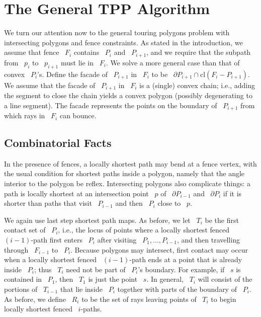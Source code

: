 \documentclass[11pt]{article}
\begin{document}
\section{The General TPP Algorithm}

We turn our attention now to the general touring polygons problem with intersecting polygons and fence constraints.
As stated in the introduction, we assume that fence ~\(F_i\) contains ~\(P_i\) and ~\(P_{i+1}\), and we require that the subpath from ~\(p_i\) to ~\(p_{i+1}\) must lie in ~\(F_i\).
We solve a more general case than that of convex ~\(P_i\)'s.
Define the facade of ~\(P_{i+1}\) in ~\(F_i\) to be ~\(\partial P_{i+1} \cap \mathrm{cl}(F_i - P_{i+1})\).
We assume that the facade of ~\(P_{i+1}\) in ~\(F_i\) is a (single) convex chain; i.e., adding the segment to close the chain yields a convex polygon (possibly degenerating to a line segment).
The facade represents the points on the boundary of ~\(P_{i+1}\) from which rays in ~\(F_i\) can bounce.

\subsection{Combinatorial Facts}

In the presence of fences, a locally shortest path may bend at a fence vertex, with the usual condition for shortest paths inside a polygon, namely that the angle interior to the polygon be reflex.
Intersecting polygons also complicate things: a path is locally shortest at an intersection point ~\(p\) of ~\(\partial P_{i-1}\) and ~\(\partial P_i\) if it is shorter than paths that visit ~\(P_{i-1}\) and then ~\(P_i\) close to ~\(p\).

We again use last step shortest path maps.
As before, we let ~\(T_i\) be the first contact set of ~\(P_i\), i.e., the locus of points where a locally shortest fenced ~\((i-1)\)-path first enters ~\(P_i\) after visiting ~\(P_1, \ldots, P_{i-1}\), and then travelling through ~\(F_{i-1}\) to ~\(P_i\).
Because polygons may intersect, first contact may occur when a locally shortest fenced ~\((i-1)\)-path ends at a point that is already inside ~\(P_i\); thus ~\(T_i\) need not be part of ~\(P_i\)'s boundary.
For example, if ~\(s\) is contained in ~\(P_1\), then ~\(T_1\) is just the point ~\(s\).
In general, ~\(T_i\) will consist of the portions of ~\(T_{i-1}\) that lie inside ~\(P_i\) together with parts of the boundary of ~\(P_i\).
As before, we define ~\(R_i\) to be the set of rays leaving points of ~\(T_i\) to begin locally shortest fenced ~\(i\)-paths.
\end{document}

